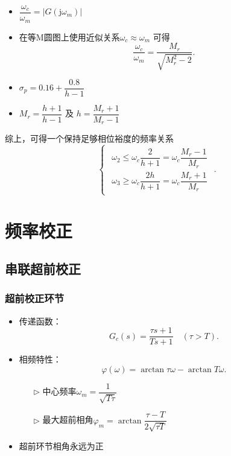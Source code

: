 \documentclass[14pt,a4paper]{article}
\theoremstyle{plain}
\theoremstyle{definition}
\theoremstyle{remark}
\theoremstyle{plain}
\theoremstyle{plain}
\theoremstyle{plain}
\theoremstyle{definition}
\theoremstyle{remark}
\numberwithin{equation}{section}
\begin{document}
				\begin{itemize}
					\item $\dfrac{\omega_c}{\omega_{m}} = \left| G(\mathrm{j} \omega_{m}) \right| $ 
					\item 在等M圆图上使用近似关系$\omega_c \approx \omega_{m}$ 可得
						\[
							\dfrac{\omega_c}{\omega_m} = \dfrac{M_r}{\sqrt{M_r^2-2}} 
						.\] 
					\item $\sigma_p = 0.16+ \dfrac{0.8}{h-1}$ 
					\item $M_r = \dfrac{h+1}{h-1}$ 及 $h = \dfrac{M_r+1}{M_r-1}$ 
				\end{itemize} 

				综上，可得一个保持足够相位裕度的频率关系
					\[
					\begin{cases}
						\begin{aligned}
							\omega_2 \le \omega_c \dfrac{2}{h+1} = \omega_c \dfrac{M_r-1}{M_r} \\
							\omega_3 \ge \omega_c \dfrac{2h}{h+1} = \omega_c \dfrac{M_r+1}{M_r} 
						\end{aligned}  
					\end{cases} 
					.\]

	\newpage
	\section{频率校正}%
	\label{sec:频率校正}
	
		\subsection{串联超前校正}%
		\label{sub:串联超前校正}
		
			\subsubsection{超前校正环节}%
			\label{ssub:超前校正环节}
			
				\begin{itemize}
					\item 传递函数：
						\[
							G_c(s) = \dfrac{\tau s+1}{Ts+1} \quad \left( \tau > T \right)  
						.\] 
					\item 相频特性：
						\[
							\varphi(\omega) = \arctan \tau \omega - \arctan T\omega
						.\] 
						\begin{itemize}
							\item[$\triangleright$] 中心频率$\omega_m = \dfrac{1}{\sqrt{T\tau}}$ 
							\item[$\triangleright$] 最大超前相角$\varphi_m = \arctan \dfrac{\tau-T}{2\sqrt{\tau T}}$ 
						\end{itemize} 
					\item 超前环节相角永远为正

				\end{itemize}	
\end{document}
